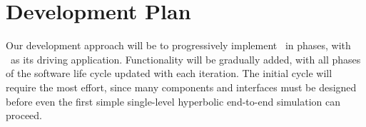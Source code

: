 \documentclass[10pt,twocolumn]{article}
\begin{document}

\section{Development Plan} \label{s:plan}




Our development approach will be to progressively implement \cello\ in
phases, with \enzoii\ as its driving application.  Functionality will
be gradually added, with all phases of the software life cycle updated
with each iteration.  The initial cycle will require the most effort,
since many components and interfaces must be designed before even the
first simple single-level hyperbolic end-to-end simulation can
proceed.
\end{document}
